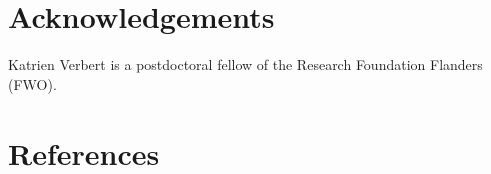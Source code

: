 \documentclass[final,5p,times,twocolumn,authoryear]{elsarticle}
\begin{document}



\section*{Acknowledgements}
Katrien Verbert is a postdoctoral fellow of the Research Foundation Flanders (FWO).

\section*{References}
   
  





\end{document}
